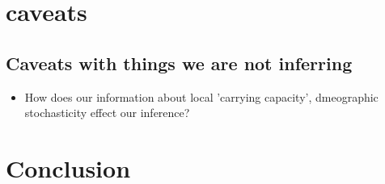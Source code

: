 \documentclass[]{article}
\begin{document}
\section{caveats}
\subsection{Caveats with things we are not inferring}
\begin{itemize}
    \item How does our information about local 'carrying capacity', dmeographic stochasticity
        effect our inference? 
\end{itemize}




\section{Conclusion}

\clearpage
{
\footnotesize

}
\end{document}
